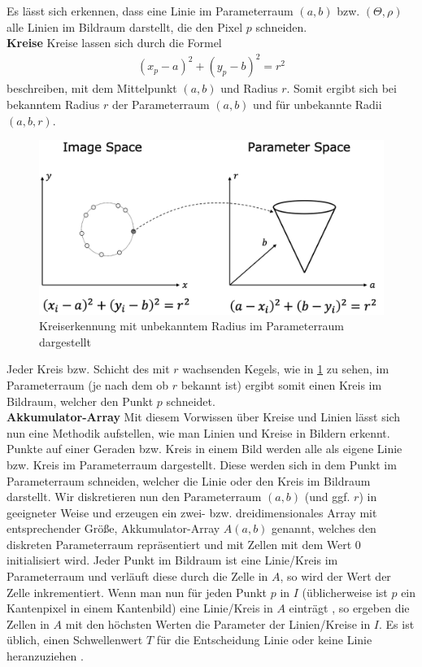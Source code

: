 Es lässt sich erkennen, dass eine Linie im Parameterraum $(a,b)$ bzw. $(\Theta, \rho)$ alle Linien im Bildraum darstellt, die den Pixel $p$ schneiden\cite{nayar_boundary_detection}.\\

\textbf{Kreise} Kreise lassen sich durch die Formel
\begin{align}
    (x_p - a)^2 + (y_p - b)^2 = r^2
\end{align}
beschreiben, mit dem Mittelpunkt $(a,b)$ und Radius $r$. Somit ergibt sich bei bekanntem Radius $r$ der Parameterraum $(a, b)$ und für unbekannte Radii $(a, b, r)$.\\
\newpage
\begin{figure}[htbp]
    \centering
    \includegraphics[width=12cm]{bilder/hough_circle_space.png}
    \caption[Parameterraum Kreise]{Kreiserkennung mit unbekanntem Radius im Parameterraum dargestellt \cite{nayar_boundary_detection}}
    \label{fig:hough_circle_space}
\end{figure}

Jeder Kreis bzw. Schicht des mit $r$ wachsenden Kegels, wie in \ref{fig:hough_circle_space} zu sehen, im Parameterraum (je nach dem ob $r$ bekannt ist) ergibt somit einen Kreis im Bildraum, welcher den Punkt $p$ schneidet\cite{nayar_boundary_detection}.\\

\textbf{Akkumulator-Array} Mit diesem Vorwissen über Kreise und Linien lässt sich nun eine Methodik aufstellen, wie man Linien und Kreise in Bildern erkennt. Punkte auf einer Geraden bzw. Kreis in einem Bild werden alle als eigene Linie bzw. Kreis im Parameterraum dargestellt. Diese werden sich in dem Punkt im Parameterraum schneiden, welcher die Linie oder den Kreis im Bildraum darstellt. Wir diskretieren nun den Parameterraum $(a,b)$ (und ggf. $r$) in geeigneter Weise und erzeugen ein zwei- bzw. dreidimensionales Array mit entsprechender Größe, Akkumulator-Array $A(a,b)$ genannt, welches den diskreten Parameterraum repräsentiert und mit Zellen mit dem Wert $0$ initialisiert wird. Jeder Punkt im Bildraum ist eine Linie/Kreis im Parameterraum und verläuft diese durch die Zelle in $A$, so wird der Wert der Zelle inkrementiert. Wenn man nun für jeden Punkt $p$ in $I$ (üblicherweise ist $p$ ein Kantenpixel in einem Kantenbild) eine Linie/Kreis in $A$ \dq einträgt \dq , so ergeben die Zellen in $A$ mit den höchsten Werten die Parameter der Linien/Kreise in $I$. Es ist üblich, einen Schwellenwert $T$ für die Entscheidung Linie oder keine Linie heranzuziehen\cite{nayar_boundary_detection} \cite[S.\. 121ff.]{Klette14}.\\


